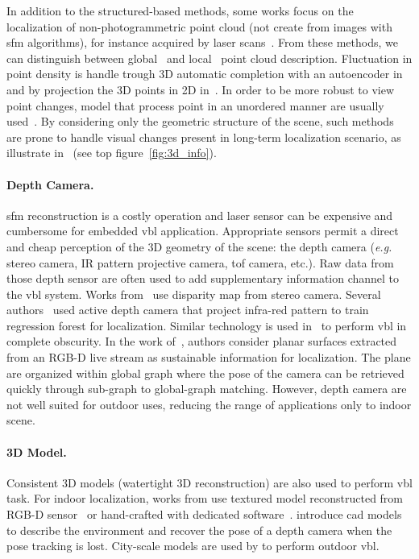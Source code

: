 			In addition to the structured-based methods, some works focus on the localization of non-photogrammetric point cloud (\ie not create from images with \ac{sfm} algorithms), for instance acquired by laser scans~\citep{Elbaz2017,Uy2018,Schonberger2017a,Zeng2016,Yew2018,Deng2018}. From these methods, we can distinguish between global~\citep{Uy2018,Schonberger2017a} and local~\citep{Elbaz2017,Zeng2016,Yew2018,Deng2018} point cloud description. Fluctuation in point density is handle trough 3D automatic completion with an autoencoder in~\citep{Schonberger2017a} and by projection the 3D points in 2D in~\citep{Elbaz2017}. In order to be more robust to view point changes, model that process point in an unordered manner are usually used~\citep{Yew2018,Deng2018}. By considering only the geometric structure of the scene, such methods are prone to handle visual changes present in long-term localization scenario, as illustrate in~\citep{Schonberger2017a,Uy2018} (see top figure~\ref{fig:3d_info}).

		\paragraph{Depth Camera.}
			\Ac{sfm} reconstruction is a costly operation and laser sensor can be expensive and cumbersome for embedded \ac{vbl} application. Appropriate sensors permit a direct and cheap perception of the 3D geometry of the scene: the depth camera (\textit{e.g.} stereo camera, IR pattern projective camera, \ac{tof} camera, etc.). Raw data from those depth sensor are often used to add supplementary information channel to the \ac{vbl} system. Works from~\citep{Ni2009,McManus2014,Wan2014} use disparity map from stereo camera. Several authors~\citep{Shotton2013,Guzman-rivera2014,Glocker2015} used active depth camera that project infra-red pattern to train regression forest for localization. Similar technology is used in~\citep{Li2016a} to perform \ac{vbl} in complete obscurity. In the work of~\citep{Fernandez-Moral2013}, authors consider planar surfaces extracted from an RGB-D live stream as sustainable information for localization. The plane are organized within global graph where the pose of the camera can be retrieved quickly through sub-graph to global-graph matching.  However, depth camera are not well suited for outdoor uses, reducing the range of applications only to indoor scene.

		\paragraph{3D Model.} 
			Consistent 3D models (\ie watertight 3D reconstruction) are also used to perform \ac{vbl} task.  For indoor localization, works from \citep{Shotton2013,Pascoe2015} use textured model reconstructed from RGB-D sensor~\citep{Shotton2013} or hand-crafted with dedicated software~\citep{Pascoe2015}. \citet{Salas-Moreno2013} introduce \ac{cad} models to describe the environment and recover the pose of a depth camera when the pose tracking is lost. City-scale models are used by \citep{Aubry2014,Poglitsch2015,Pascoe2015a,Pascoe2015b,Caselitz2016} to perform outdoor \ac{vbl}. 

